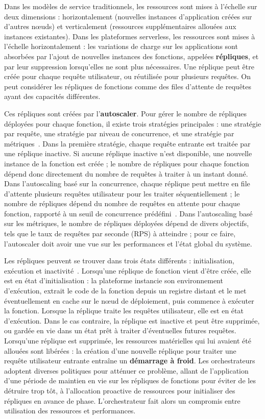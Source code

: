 Dans les modèles de service traditionnels, les ressources sont mises à l'échelle sur deux dimensions : horizontalement (nouvelles instances d'application créées sur d'autres nœuds) et verticalement (ressources supplémentaires allouées aux instances existantes). Dans les plateformes serverless, les ressources sont mises à l'échelle horizontalement : les variations de charge sur les applications sont absorbées par l'ajout de nouvelles instances des fonctions, appelées \textbf{répliques}, et par leur suppression lorsqu'elles ne sont plus nécessaires. Une réplique peut être créée pour chaque requête utilisateur, ou réutilisée pour plusieurs requêtes. On peut considérer les répliques de fonctions comme des files d'attente de requêtes ayant des capacités différentes.

Ces répliques sont créées par l'\textbf{autoscaler}. Pour gérer le nombre de répliques déployées pour chaque fonction, il existe trois stratégies principales : une stratégie par requête, une stratégie par niveau de concurrence, et une stratégie par métriques~\cite{mahmoudiSimFaaSPerformanceSimulator2021}. Dans la première stratégie, chaque requête entrante est traitée par une réplique inactive. Si aucune réplique inactive n'est disponible, une nouvelle instance de la fonction est créée ; le nombre de répliques pour chaque fonction dépend donc directement du nombre de requêtes à traiter à un instant donné. Dans l'autoscaling basé sur la concurrence, chaque réplique peut mettre en file d'attente plusieurs requêtes utilisateur pour les traiter séquentiellement ; le nombre de répliques dépend du nombre de requêtes en attente pour chaque fonction, rapporté à un seuil de concurrence prédéfini~\cite{herofake}. Dans l'autoscaling basé sur les métriques, le nombre de répliques déployées dépend de divers objectifs, tels que le taux de requêtes par seconde (\gls{RPS}) à atteindre ; pour ce faire, l'autoscaler doit avoir une vue sur les performances et l'état global du système.

Les répliques peuvent se trouver dans trois états différents : initialisation, exécution et inactivité~\cite{SchleierSmith2021WhatSC}. Lorsqu'une réplique de fonction vient d'être créée, elle est en état d'initialisation : la plateforme instancie son environnement d'exécution, extrait le code de la fonction depuis un registre distant et le met éventuellement en cache sur le nœud de déploiement, puis commence à exécuter la fonction. Lorsque la réplique traite les requêtes utilisateur, elle est en état d'exécution. Dans le cas contraire, la réplique est inactive et peut être supprimée, ou gardée en vie dans un état prêt à traiter d'éventuelles futures requêtes. Lorsqu'une réplique est supprimée, les ressources matérielles qui lui avaient été allouées sont libérées : la création d'une nouvelle réplique pour traiter une requête utilisateur entrante entraîne un \textbf{démarrage à froid}. Les orchestrateurs adoptent diverses politiques pour atténuer ce problème, allant de l'application d'une période de maintien en vie sur les répliques de fonctions pour éviter de les détruire trop tôt, à l'allocation proactive de ressources pour initialiser des répliques en avance de phase. L'orchestrateur fait alors un compromis entre utilisation des ressources et performances.

